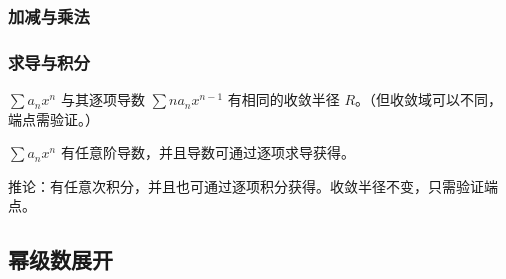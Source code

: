 \documentclass[12pt, a4paper, UTF8, openany]{ctexbook}
\begin{document}
        \subsubsection{加减与乘法}

        \subsubsection{求导与积分}
        $\sum a_n x^n$ 与其逐项导数 $\sum n a_n x^{n - 1}$ 有相同的收敛半径 $R$。（但收敛域可以不同，端点需验证。）

        $\sum a_n x^n$ 有任意阶导数，并且导数可通过逐项求导获得。

        推论：有任意次积分，并且也可通过逐项积分获得。收敛半径不变，只需验证端点。

        \subsection{幂级数展开}
\end{document}
